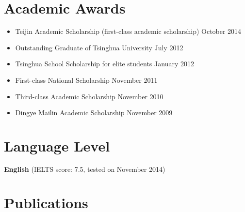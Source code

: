 \documentclass[margin]{res}
\begin{document}
\begin{resume}
\section{Academic Awards}
\begin{itemize}
   \item Teijin Academic Scholarship (first-class academic scholarship) \hfill October 2014
   \item Outstanding Graduate of Tsinghua University \hfill July 2012
   \item Tsinghua School Scholarship for elite students \hfill January 2012
   \item First-class National Scholarship \hfill November 2011
   \item Third-class Academic Scholarship \hfill November 2010
   \item Dingye Mailin Academic Scholarship \hfill November 2009
\end{itemize}

\section{Language Level}
\textbf{English} (IELTS score: 7.5, tested on November 2014)


\section{Publications}
\begin{enumerate}
 

\end{enumerate}
\end{resume}
\end{document}
